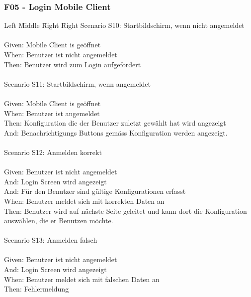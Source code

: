 \subsubsection*{F05 - Login Mobile Client}
\begin{tabbing}
    Left \= Middle \= Right \= Right  \kill
    Scenario S10: \> \> \>  Startbildschirm, wenn nicht angemeldet\\ \\
    Given: \> \> \>   Mobile Client is geöffnet\\
    When: \> \> \>  Benutzer ist nicht angemeldet\\
    Then: \> \> \>  Benutzer wird zum Login aufgefordert\\
    \\
    Scenario S11: \> \> \>  Startbildschirm, wenn angemeldet\\ \\
    Given: \> \> \>   Mobile Client is geöffnet\\
    When: \> \> \>  Benutzer ist angemeldet\\
    Then: \> \> \>  Konfiguration die der Benutzer zuletzt gewählt hat wird angezeigt\\
    And: \> \> \>    Benachrichtigungs Buttons gemäss Konfiguration werden angezeigt.\\
    \\
    Scenario S12: \> \> \>  Anmelden korrekt\\ \\
    Given: \> \> \>  Benutzer ist nicht angemeldet\\
    And: \> \> \>    Login Screen wird angezeigt\\
    And: \> \> \>     Für den Benutzer sind gültige Konfigurationen erfasst\\
    When: \> \> \>   Benutzer meldet sich mit korrekten Daten an\\
    Then: \> \> \>   Benutzer wird auf nächste Seite geleitet und kann dort die Konfiguration auswählen, die er Benutzen möchte.\\
    \\
    Scenario S13: \> \> \>  Anmelden falsch\\ \\
    Given: \> \> \>  Benutzer ist nicht angemeldet\\
    And: \> \> \>    Login Screen wird angezeigt\\
    When: \> \> \>   Benutzer meldet sich mit falschen Daten an\\
    Then: \> \> \>   Fehlermeldung\\

\end{tabbing}
